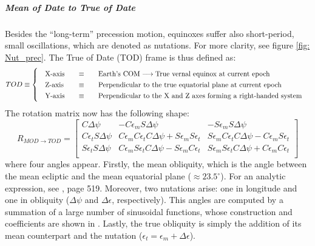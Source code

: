 		\FloatBarrier
		\subparagraph{Mean of Date to True of Date \\}
		\indent Besides the ``long-term'' precession motion, equinoxes suffer also short-period, small oscillations, which are denoted as nutations. For more clarity, see figure \ref{fig:	Nut_prec}. The True of Date (TOD) frame is thus defined as: \\
		\[
		\arraycolsep=10pt
		\def\arraystretch{1.3}
		TOD\equiv\left\{
		\begin{array}{lll}
		\text{X-axis} 	& \equiv 	& \text{Earth's COM} \longrightarrow \text{True vernal equinox at current epoch} \\
		\text{Z-axis} 	& \equiv 	& \text{Perpendicular to the true equatorial plane at current epoch} \\
		\text{Y-axis} 	& \equiv 	& \text{Perpendicular to the X and Z axes forming a right-handed system} \\
		\end{array}
		\right.
		\]
		\indent The rotation matrix now has the following shape:
		\begin{equation}
		R_{MOD\rightarrow TOD} = 
		\left[ 
		\begin{array}{lll}
		C \Delta \psi 				& - C \epsilon_m S \Delta \psi 	& - S \epsilon_m S \Delta \psi \\
		C \epsilon_t S \Delta \psi 	& C \epsilon_m C \epsilon_t C \Delta \psi + S \epsilon_m S \epsilon_t & S \epsilon_m C \epsilon_t C \Delta \psi - C \epsilon_m S \epsilon_t \\
		S \epsilon_t S \Delta \psi 	& C \epsilon_m S \epsilon_t C \Delta \psi - S \epsilon_m C \epsilon_t & S \epsilon_m S \epsilon_t C \Delta \psi + C \epsilon_m C \epsilon_t \\
		\end{array}
		\right]
		\label{eq: R_MOD_TOD}
		\end{equation}
		\noindent where four angles appear. Firstly, the mean obliquity, which is the angle between the mean ecliptic and the mean equatorial plane ($\approx 23.5^{\circ}$). For an analytic expression, see \cite{Tapley}, page 519. Moreover, two nutations arise: one in longitude and one in obliquity ($\Delta \psi$ and $\Delta \epsilon$, respectively). This angles are computed by a summation of a large number of sinusoidal functions, whose construction and coefficients are shown in \cite{IERS_conventions}. Lastly, the true obliquity is simply the addition of its mean counterpart and the nutation ($\epsilon_t = \epsilon_m + \Delta \epsilon$).
